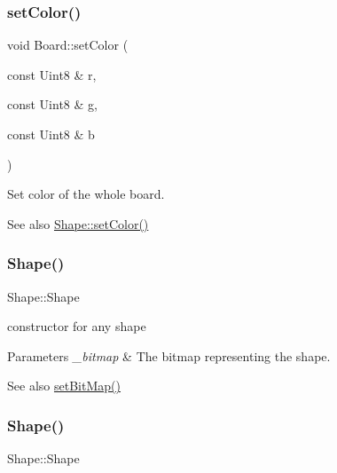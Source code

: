\subsubsection{\texorpdfstring{set\+Color()}{setColor()}}
{\footnotesize\ttfamily void Board\+::set\+Color (\begin{DoxyParamCaption}\item[{const Uint8 \&}]{r,  }\item[{const Uint8 \&}]{g,  }\item[{const Uint8 \&}]{b }\end{DoxyParamCaption})\hspace{0.3cm}{\ttfamily [inline]}}



Set color of the whole board. 

\begin{DoxySeeAlso}{See also}
\mbox{\hyperlink{class_shape_a657c70819a01a52d56c68302f07ffad9}{Shape\+::set\+Color()}} 
\end{DoxySeeAlso}
\mbox{\label{class_board_a8b614d73e9091d05a3e8b5a119bf509a}} 
\subsubsection{\texorpdfstring{Shape()}{Shape()}\hspace{0.1cm}{\footnotesize\ttfamily [1/3]}}
{\footnotesize\ttfamily Shape\+::\+Shape\hspace{0.3cm}{\ttfamily [inline]}}



constructor for any shape 


\begin{DoxyParams}{Parameters}
{\em \+\_\+bitmap} & The bitmap representing the shape. \\
\hline
\end{DoxyParams}
\begin{DoxySeeAlso}{See also}
\mbox{\hyperlink{class_shape_ad539a5441a4aaa95349fd1bfc76043a1}{set\+Bit\+Map()}} 
\end{DoxySeeAlso}
\mbox{\label{class_board_a37e0820a3b0346435b5fa57761480b32}} 
\subsubsection{\texorpdfstring{Shape()}{Shape()}\hspace{0.1cm}{\footnotesize\ttfamily [2/3]}}
{\footnotesize\ttfamily Shape\+::\+Shape\hspace{0.3cm}{\ttfamily [inline]}}



